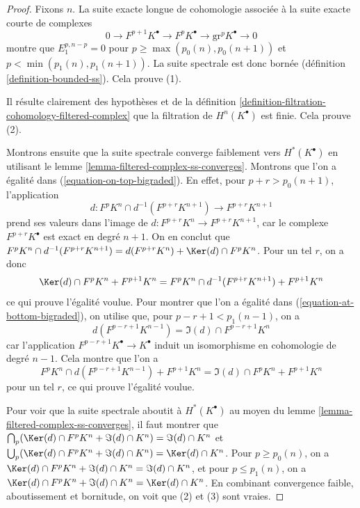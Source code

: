 \begin{proof}
Fixons $n$. La suite exacte longue de cohomologie associée à
la suite exacte courte de complexes
$$
0 \to F^{p + 1}K^\bullet \to F^pK^\bullet \to \text{gr}^pK^\bullet \to 0
$$
montre que $E_1^{p, n - p} = 0$ pour $p \geq \max(p_0(n), p_0(n + 1))$ et
$p < \min(p_1(n), p_1(n + 1))$. La suite spectrale est donc bornée
(définition \ref{definition-bounded-ss}). Cela prouve (1).

\medskip\noindent
Il résulte clairement des hypothèses et de la
définition \ref{definition-filtration-cohomology-filtered-complex}
que la filtration de $H^n(K^\bullet)$ est finie. Cela prouve (2).

\medskip\noindent
Montrons ensuite que la suite spectrale converge faiblement vers
$H^*(K^\bullet)$ en utilisant le
lemme \ref{lemma-filtered-complex-ss-converges}.
Montrons que l'on a égalité dans (\ref{equation-on-top-bigraded}).
En effet, pour $p + r > p_0(n + 1)$, l'application
$$
d : F^pK^{n} \cap d^{-1}(F^{p + r}K^{n + 1}) \to F^{p + r}K^{n + 1}
$$
prend ses valeurs dans l'image de $d : F^{p + r}K^n \to F^{p + r}K^{n + 1}$,
car le complexe $F^{p + r}K^\bullet$ est exact en degré $n + 1$.
On en conclut que $F^pK^{n} \cap d^{-1}(F^{p + r}K^{n + 1}) =
d(F^{p + r}K^n) + \Ker(d) \cap F^pK^n$. Pour un tel $r$, on a donc
$$
\Ker(d) \cap F^pK^{n} + F^{p + 1}K^{n} =
F^pK^{n} \cap d^{-1}(F^{p + r}K^{n + 1}) + F^{p + 1}K^{n}
$$
ce qui prouve l'égalité voulue. Pour montrer que l'on a égalité dans
(\ref{equation-at-bottom-bigraded}), on utilise que, pour $p - r + 1 < p_1(n - 1)$,
on a
$$
d(F^{p - r + 1}K^{n - 1}) = \Im(d) \cap F^{p - r + 1}K^n
$$
car l'application $F^{p - r + 1}K^\bullet \to K^\bullet$ induit un
isomorphisme en cohomologie de degré $n - 1$. Cela montre que
l'on a
$$
F^pK^{n} \cap d(F^{p - r + 1}K^{n - 1}) + F^{p + 1}K^{n} =
\Im(d) \cap F^pK^{n} + F^{p + 1}K^{n}
$$
pour un tel $r$, ce qui prouve l'égalité voulue.

\medskip\noindent
Pour voir que la suite spectrale aboutit à $H^*(K^\bullet)$ au moyen du
lemme \ref{lemma-filtered-complex-ss-converges}, il faut montrer que
$\bigcap_p (\Ker(d) \cap F^pK^n + \Im(d) \cap K^n) = \Im(d) \cap K^n$
et
$\bigcup_p (\Ker(d) \cap F^pK^n + \Im(d) \cap K^n) = \Ker(d) \cap K^n$.
Pour $p \geq p_0(n)$, on a
$\Ker(d) \cap F^pK^n + \Im(d) \cap K^n = \Im(d) \cap K^n$,
et pour $p \leq p_1(n)$, on a
$\Ker(d) \cap F^pK^n + \Im(d) \cap K^n = \Ker(d) \cap K^n$.
En combinant convergence faible, aboutissement et bornitude, on voit
que (2) et (3) sont vraies.
\end{proof}

